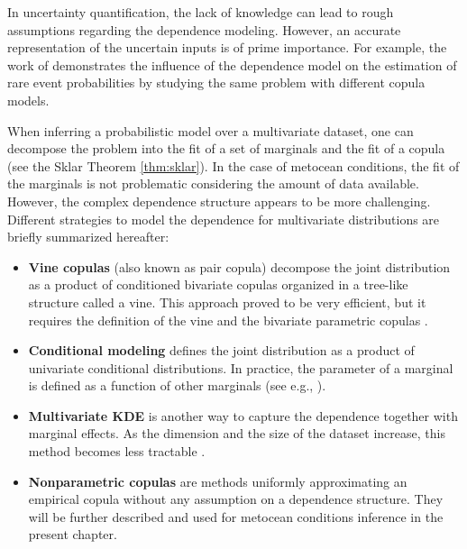In uncertainty quantification, the lack of knowledge can lead to rough assumptions regarding the dependence modeling. 
However, an accurate representation of the uncertain inputs is of prime importance. 
For example, the work of \citet{torre_2019_copula_reliability} demonstrates the influence of the dependence model on the estimation of rare event probabilities by studying the same problem with different copula models. 

When inferring a probabilistic model over a multivariate dataset, one can decompose the problem into the fit of a set of marginals and the fit of a copula (see the Sklar Theorem \ref{thm:sklar}). 
In the case of metocean conditions, the fit of the marginals is not problematic considering the amount of data available. 
However, the complex dependence structure appears to be more challenging. 
Different strategies to model the dependence for multivariate distributions are briefly summarized hereafter: 
\begin{itemize}
    \item \textbf{Vine copulas} (also known as pair copula) decompose the joint distribution as a product of conditioned bivariate copulas organized in a tree-like structure called a vine. 
    This approach proved to be very efficient, but it requires the definition of the vine and the bivariate parametric copulas \citep{joe2011dependence}. 
    \item \textbf{Conditional modeling} defines the joint distribution as a product of univariate conditional distributions. 
    In practice, the parameter of a marginal is defined as a function of other marginals (see e.g., \citealt{vanem_fekhari_2023}). 
    \item \textbf{Multivariate KDE} is another way to capture the dependence together with marginal effects. As the dimension and the size of the dataset increase, this method becomes less tractable \citep{wand_jones_1994_kde}.  
    \item \textbf{Nonparametric copulas} are methods uniformly approximating an empirical copula without any assumption on a dependence structure. They will be further described and used for metocean conditions inference in the present chapter.    
\end{itemize}

